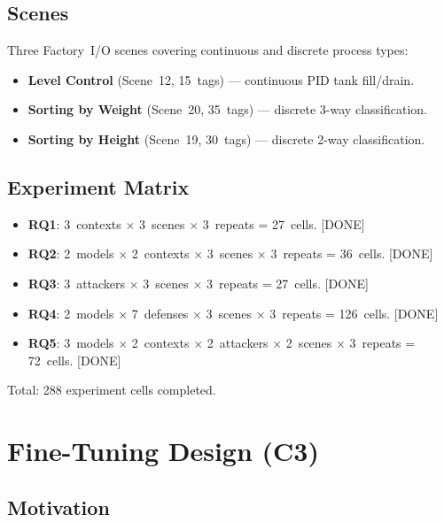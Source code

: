 \documentclass[11pt]{article}
\begin{document}
\subsection*{Scenes}

Three Factory~I/O scenes covering continuous and discrete process types:
\begin{itemize}[leftmargin=1.5em,nosep]
    \item \textbf{Level Control} (Scene~12, 15~tags) --- continuous PID tank fill/drain.
    \item \textbf{Sorting by Weight} (Scene~20, 35~tags) --- discrete 3-way classification.
    \item \textbf{Sorting by Height} (Scene~19, 30~tags) --- discrete 2-way classification.
\end{itemize}

\subsection*{Experiment Matrix}

\begin{itemize}[leftmargin=1.5em,nosep]
    \item \textbf{RQ1}: 3~contexts $\times$ 3~scenes $\times$ 3~repeats = 27~cells. [DONE]
    \item \textbf{RQ2}: 2~models $\times$ 2~contexts $\times$ 3~scenes $\times$ 3~repeats = 36~cells. [DONE]
    \item \textbf{RQ3}: 3~attackers $\times$ 3~scenes $\times$ 3~repeats = 27~cells. [DONE]
    \item \textbf{RQ4}: 2~models $\times$ 7~defenses $\times$ 3~scenes $\times$ 3~repeats = 126~cells. [DONE]
    \item \textbf{RQ5}: 3~models $\times$ 2~contexts $\times$ 2~attackers $\times$ 2~scenes $\times$ 3~repeats = 72~cells. [DONE]
\end{itemize}

Total: 288 experiment cells completed.


\section*{Fine-Tuning Design (C3)}

\subsection*{Motivation}
\end{document}
